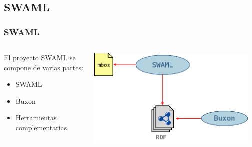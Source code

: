 \documentclass[spanish,notes=hide]{beamer}
\begin{document}
\subsection{SWAML}
\frame
{
  \frametitle{SWAML}

  \begin{columns}
   \begin{column}{0.35\textwidth}
	El proyecto SWAML se compone de varias partes:
	\begin{itemize}
	 \item \begin{Large}SWAML\end{Large}
	 \item \begin{Large}Buxon\end{Large}
	 \item Herramientas complementarias
	\end{itemize}
   \end{column}
   \begin{column}{0.65\textwidth}
	\includegraphics[width=0.95\textwidth]{images/swaml.png}
   \end{column}
  \end{columns}
}
\frame
\end{document}

